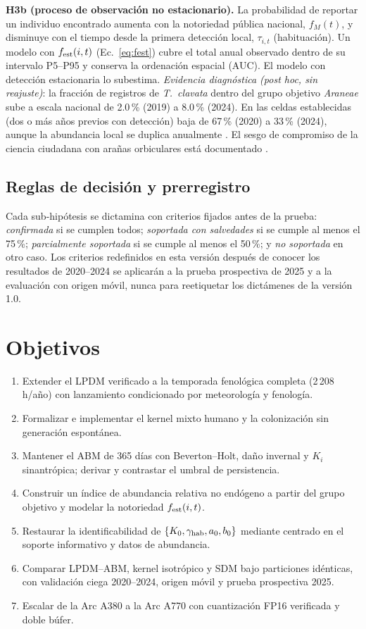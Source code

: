 \documentclass[11pt,letterpaper]{article}
\begin{document}
\textbf{H3b (proceso de observación no estacionario).} La probabilidad de reportar un individuo encontrado aumenta con la notoriedad pública nacional, $f_M(t)$, y disminuye con el tiempo desde la primera detección local, $\tau_{i,t}$ (habituación). Un modelo con $f_{\rm est}(i,t)$ (Ec.~\ref{eq:fest}) cubre el total anual observado dentro de su intervalo P5--P95 y conserva la ordenación espacial (AUC). El modelo con detección estacionaria lo subestima.
\emph{Evidencia diagnóstica (post hoc, sin reajuste)}: la fracción de registros de \textit{T.~clavata} dentro del grupo objetivo \textit{Araneae} sube a escala nacional de 2.0\,\% (2019) a 8.0\,\% (2024). En las celdas establecidas (dos o más años previos con detección) baja de 67\,\% (2020) a 33\,\% (2024), aunque la abundancia local se duplica anualmente \cite{pemberton2025}. El sesgo de compromiso de la ciencia ciudadana con arañas orbiculares está documentado \cite{deitsch2024}.

\subsection{Reglas de decisión y prerregistro}
Cada sub-hipótesis se dictamina con criterios fijados antes de la prueba: \emph{confirmada} si se cumplen todos; \emph{soportada con salvedades} si se cumple al menos el 75\,\%; \emph{parcialmente soportada} si se cumple al menos el 50\,\%; y \emph{no soportada} en otro caso. Los criterios redefinidos en esta versión después de conocer los resultados de 2020--2024 se aplicarán a la prueba prospectiva de 2025 y a la evaluación con origen móvil, nunca para reetiquetar los dictámenes de la versión 1.0.

\section{Objetivos}
\begin{enumerate}
\item Extender el LPDM verificado a la temporada fenológica completa (2\,208 h/año) con lanzamiento condicionado por meteorología y fenología.
\item Formalizar e implementar el kernel mixto humano y la colonización sin generación espontánea.
\item Mantener el ABM de 365 días con Beverton--Holt, daño invernal y $K_i$ sinantrópica; derivar y contrastar el umbral de persistencia.
\item Construir un índice de abundancia relativa no endógeno a partir del grupo objetivo y modelar la notoriedad $f_{\rm est}(i,t)$.
\item Restaurar la identificabilidad de $\{K_0,\gamma_{\rm hab},a_0,b_0\}$ mediante centrado en el soporte informativo y datos de abundancia.
\item Comparar LPDM--ABM, kernel isotrópico y SDM bajo particiones idénticas, con validación ciega 2020--2024, origen móvil y prueba prospectiva 2025.
\item Escalar de la Arc A380 a la Arc A770 con cuantización FP16 verificada y doble búfer.
\end{enumerate}
\end{document}
